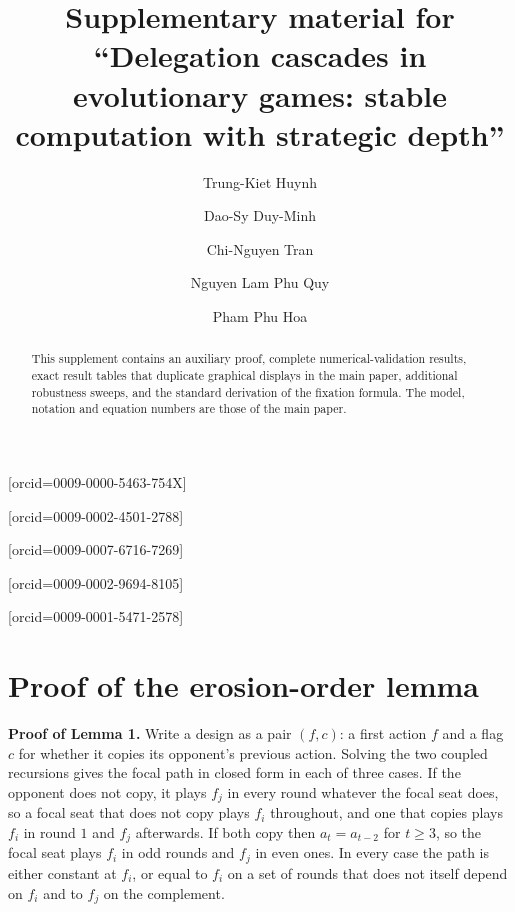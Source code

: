 \documentclass[a4paper,fleqn]{cas-sc}
\begin{document}
\let\WriteBookmarks\relax
\def\floatpagepagefraction{1}
\def\textpagefraction{.001}


\title[mode=title]{Supplementary material for ``Delegation cascades in
evolutionary games: stable computation with strategic depth''}

\author[1]{Trung-Kiet Huynh}[orcid=0009-0000-5463-754X]
\author[1]{Dao-Sy Duy-Minh}[orcid=0009-0002-4501-2788]
\author[1]{Chi-Nguyen Tran}[orcid=0009-0007-6716-7269]
\author[1]{Nguyen Lam Phu Quy}[orcid=0009-0002-9694-8105]
\author[1]{Pham Phu Hoa}[orcid=0009-0001-5471-2578]


\begin{abstract}
This supplement contains an auxiliary proof, complete numerical-validation
results, exact result tables that duplicate graphical displays in the main
paper, additional robustness sweeps, and the standard derivation of the
fixation formula. The model, notation and equation numbers are those of the
main paper.
\end{abstract}

\maketitle

\renewcommand{\thesection}{S\arabic{section}}
\renewcommand{\thetable}{S\arabic{table}}
\renewcommand{\thefigure}{S\arabic{figure}}

\section{Proof of the erosion-order lemma}
\label{supp:proof-order}

\noindent\textbf{Proof of Lemma 1.}
Write a design as a pair $(f,c)$: a first action $f$ and a flag $c$ for whether
it copies its opponent's previous action. Solving the two coupled recursions
gives the focal path in closed form in each of three cases. If the opponent
does not copy, it plays $f_{j}$ in every round whatever the focal seat does, so
a focal seat that does not copy plays $f_{i}$ throughout, and one that copies
plays $f_{i}$ in round $1$ and $f_{j}$ afterwards. If both copy then
$a_{t}=a_{t-2}$ for $t\ge3$, so the focal seat plays $f_{i}$ in odd rounds and
$f_{j}$ in even ones. In every case the path is either constant at $f_{i}$, or
equal to $f_{i}$ on a set of rounds that does not itself depend on $f_{i}$ and
to $f_{j}$ on the complement.
\end{document}
